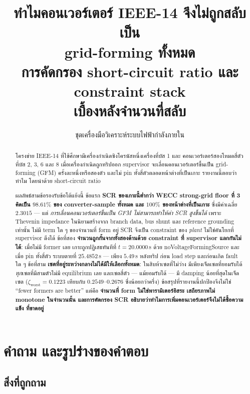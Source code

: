 \documentclass[12pt,a4paper]{article}
\title{\bfseries ทำไมคอนเวอร์เตอร์ IEEE-14 จึงไม่ถูกสลับเป็น\\[2pt]
grid-forming ทั้งหมด\\[8pt]
\large การคัดกรอง short-circuit ratio และ constraint stack\\
เบื้องหลังจำนวนที่สลับ}
\author{ชุดเครื่องมือวิเคราะห์ระบบไฟฟ้ากำลังภายใน}
\date{}
\theoremstyle{remark}
\newcommand{\zworst}{\zeta_{\mathrm{worst}}}
\newcommand{\code}[1]{{\ttfamily\small\hyphenchar\font=-1 #1}}
\begin{document}
\maketitle
\thispagestyle{fancy}

\begin{abstract}
\noindent
โครงข่าย IEEE-14 ที่ใช้ศึกษามีเครื่องกำเนิดซิงโครนัสหนึ่งเครื่องที่บัส 1 และ
คอนเวอร์เตอร์สองโหมดสี่ตัวที่บัส 2, 3, 6 และ 8 เมื่อเครื่องกำเนิดถูกทริปออก
supervisor จะเลื่อนคอนเวอร์เตอร์ขึ้นเป็น grid-forming (GFM) ครั้งละหนึ่งหรือสองตัว
และไม่ pin ทั้งสี่ตัวตลอดหน้าต่างที่เป็นเกาะ รายงานนี้ตอบว่าทำไม โดยนำด้วย
short-circuit ratio

ผลลัพธ์สามข้อรองรับข้อโต้แย้งนี้ ข้อแรก \textbf{SCR ของเกาะนี้ต่ำกว่า WECC
strong-grid floor ที่ 3 คิดเป็น $98.61\%$ ของ converter-sample ทั้งหมด และ
$100\%$ ของหน้าต่างที่เป็นเกาะ} ซึ่งมีค่าเฉลี่ย $2.3015$ --- แต่
\emph{การเลื่อนคอนเวอร์เตอร์ขึ้นเป็น GFM ไม่สามารถทำให้ค่า SCR สูงขึ้นได้}
เพราะ Thevenin impedance ในนิยามสร้างจาก branch data, bus shunt และ
reference grounding เท่านั้น ไม่มี term ใด ๆ ของจำนวนที่ form อยู่ SCR จึงเป็น
constraint ของ \emph{plant} ไม่ใช่คันโยกที่ supervisor ดึงได้ ข้อที่สอง
\textbf{จำนวนถูกกั้นจากทั้งสองด้านด้วย constraint ที่ supervisor แลกกันไม่ได้}:
เมื่อไม่มี former เลย เกาะถูกปฏิเสธทันทีที่ $t=20.0000$\,s ด้วย
\code{noVoltageFormingSource} และเมื่อ pin ทั้งสี่ตัว ระบบตายที่ $25.4852$\,s
--- เพียง $5.49$\,s หลังทริป ก่อน load step และก่อนเกิด fault ใด ๆ ข้อที่สาม
\textbf{เซตที่อยู่ระหว่างกลางไม่ได้มีให้เลือกทั้งหมด}: ในสิบห้าเซตที่ไม่ว่าง
มีเพียงเจ็ดเซตที่ยอมรับได้ \emph{ทุก}เซตที่มีสามตัวไม่มี equilibrium เลย
และเซตสี่ตัว --- แม้ยอมรับได้ --- มี damping น้อยที่สุดในเจ็ดเซต
($\zworst = 0.1223$ เทียบกับ $0.2549$--$0.2676$ ซึ่งน้อยกว่าครึ่ง)
ข้อสรุปที่รายงานนี้ปกป้องจึงไม่ใช่ ``fewer formers are better'' แต่คือ
\textbf{จำนวนที่ form ไม่ใช่พารามิเตอร์อิสระ เสถียรภาพไม่ monotone ในจำนวนนั้น
และการคัดกรอง SCR อธิบายว่าทำไมการเพิ่มคอนเวอร์เตอร์จึงไม่ได้ซื้อความแข็ง
ที่ขาดอยู่}
\end{abstract}

\tableofcontents
\clearpage

\section{คำถาม และรูปร่างของคำตอบ}

\subsection{สิ่งที่ถูกถาม}
\end{document}
